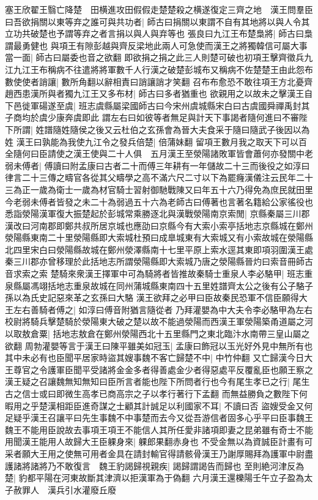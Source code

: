 塞王欣翟王翳亡降楚　田横進攻田假假走楚楚殺之横遂復定三齊之地　漢王問羣臣曰吾欲捐關以東等弃之誰可與共功者|{
	師古曰捐關以東謂不自有其地將以與人令其立功共破楚也予謂等弃之者言捐以與人與弃等也}
張良曰九江王布楚梟將|{
	師古曰梟謂最勇健也}
與項王有隙彭越與齊反梁地此兩人可急使而漢王之將獨韓信可屬大事當一面|{
	師古曰屬委也音之欲翻}
即欲捐之捐之此三人則楚可破也初項王擊齊徵兵九江九江王布稱病不往遣將將軍數千人行漢之破楚彭城布又稱病不佐楚楚王由此怨布數使使者誚讓|{
	數所角翻以辭相責曰誚讓誚才笑翻}
召布布愈恐不敢往項王方北憂齊趙西患漢所與者獨九江王又多布材|{
	師古曰多者猶重也}
欲親用之以故未之擊漢王自下邑徙軍碭遂至虞|{
	班志虞縣屬梁國師古曰今宋州虞城縣宋白曰古虞國舜禪禹封其子商均於虞少康奔虞即此}
謂左右曰如彼等者無足與計天下事謁者隨何進曰不審陛下所謂|{
	姓譜隨姓隨侯之後又云杜伯之玄孫會為晉大夫食采于隨曰隨武子後因以為姓}
漢王曰孰能為我使九江令之發兵倍楚|{
	倍蒲妹翻}
留項王數月我之取天下可以百全隨何曰臣請使之漢王使與二十人俱　五月漢王至滎陽諸敗軍皆會蕭何亦發關中老弱未傅者|{
	傅讀曰附孟康曰古者二十而傅三年耕有一年儲故二十三而後役之如淳曰律言二十三傳之疇官各從其父疇學之高不滿六尺二寸以下為罷癃漢儀注云民年二十三為正一歲為衛士一歲為材官騎士習射御馳戰陳又曰年五十六乃得免為庶民就田里今老弱未傅者皆發之未二十為弱過五十六為老師古曰傅著也言著名籍給公家徭役也}
悉詣滎陽漢軍復大振楚起於彭城常乘勝逐北與漢戰滎陽南京索閒|{
	京縣秦屬三川郡漢改曰河南郡即鄭共叔所居京城也應劭曰京縣今有大索小索亭括地志京縣城在鄭州滎陽縣東南二十里滎陽縣即大索城杜預曰成臯城東有大索城又有小索故城在滎陽縣北四里宋白曰滎陽縣故城在鄭州滎澤縣南十七里平原上索水逕其東即項羽圍漢王處秦三川郡亦曾移理於此括地志所謂滎陽縣即大索城乃唐之滎陽縣晉灼曰索音冊師古音求索之索}
楚騎來衆漢王擇軍中可為騎將者皆推故秦騎士重泉人李必駱甲|{
	班志重泉縣屬馮翊括地志重泉故城在同州蒲城縣東南四十五里姓譜齊太公之後有公子駱子孫以為氏史記惡來革之玄孫曰大駱}
漢王欲拜之必甲曰臣故秦民恐軍不信臣願得大王左右善騎者傅之|{
	如淳曰傅音附猶言隨從者}
乃拜灌嬰為中大夫令李必駱甲為左右校尉將騎兵擊楚騎於滎陽東大破之楚以故不能過滎陽而西漢王軍滎陽築甬道屬之河以取敖倉粟|{
	括地志敖倉在鄭州滎陽西北十五里縣門之東北臨汴水南帶三皇山屬之欲翻}
周勃灌嬰等言于漢王曰陳平雖美如冠玉|{
	孟康曰飾冠以玉光好外見中無所有也}
其中未必有也臣聞平居家時盜其嫂事魏不客亡歸楚不中|{
	中竹仲翻}
又亡歸漢今日大王尊官之令護軍臣聞平受諸將金金多者得善處金少者得惡處平反覆亂臣也願王察之漢王疑之召讓魏無知無知曰臣所言者能也陛下所問者行也今有尾生孝已之行|{
	尾生古之信士或曰即微生高孝已商高宗之子以孝行著行下孟翻}
而無益勝負之數陛下何暇用之乎楚漢相距臣進奇謀之士顧其計誠足以利國家不耳|{
	不讀曰否}
盜嫂受金又何足疑乎漢王召讓平曰先生事魏不中事楚而去今又從吾游信者固多心乎平曰臣事魏王魏王不能用臣說故去事項王項王不能信人其所任愛非諸項即妻之昆弟雖有奇士不能用聞漢王能用人故歸大王臣躶身來|{
	躶郎果翻赤身也}
不受金無以為資誠臣計畫有可采者願大王用之使無可用者金具在請封輸官得請骸骨漢王乃謝厚賜拜為護軍中尉盡護諸將諸將乃不敢復言　魏王豹謁歸視親疾|{
	謁歸謂謁告而歸也}
至則絶河津反為楚|{
	豹都平陽在河東故斷其津濟以拒漢軍為于偽翻}
六月漢王還櫟陽壬午立子盈為太子赦罪人　漢兵引水灌廢丘廢

